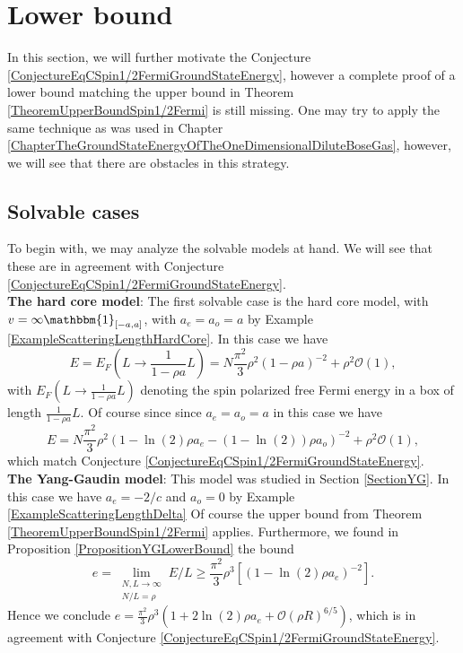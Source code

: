 \section{Lower bound}
In this section, we will further motivate the Conjecture \ref{ConjectureEqCSpin1/2FermiGroundStateEnergy}, however a complete proof of a lower bound matching the upper bound in Theorem \ref{TheoremUpperBoundSpin1/2Fermi} is still missing. One may try to apply the same technique as was used in Chapter \ref{ChapterTheGroundStateEnergyOfTheOneDimensionalDiluteBoseGas}, however, we will see that there are obstacles in this strategy.\\
\subsection{Solvable cases}
To begin with, we may analyze the solvable models at hand. We will see that these are in agreement with Conjecture \ref{ConjectureEqCSpin1/2FermiGroundStateEnergy}.\\

\textbf{The hard core model}: The first solvable case is the hard core model, with $ v=\infty \mathbbm{1}_{[-a,a]} $, with $ a_e=a_o=a $ by Example \ref{ExampleScatteringLengthHardCore}. In this case we have \begin{equation}
E=E_F\left(L\to \frac{1}{1-\rho a}L\right)=N\frac{\pi^2}{3}\rho^2\left(1-\rho a\right)^{-2}+\rho^2\mathcal{O}(1),
\end{equation} 
with $ E_F\left(L\to \frac{1}{1-\rho a}L\right) $ denoting the spin polarized free Fermi energy in a box of length $ \frac{1}{1-\rho a}L $. Of course since since $ a_e=a_o=a $ in this case we have \begin{equation}
E=N\frac{\pi^2}{3}\rho^2\left(1-\ln(2)\rho a_e-(1-\ln(2))\rho a_o\right)^{-2}+\rho^2\mathcal{O}(1),
\end{equation}
which match Conjecture \ref{ConjectureEqCSpin1/2FermiGroundStateEnergy}.\\

\textbf{The Yang-Gaudin model}:
This model was studied in Section \ref{SectionYG}. In this case we have $ a_e=-2/c $ and $ a_o=0 $ by Example \ref{ExampleScatteringLengthDelta} Of course the upper bound from Theorem \ref{TheoremUpperBoundSpin1/2Fermi} applies. Furthermore, we found in Proposition \ref{PropositionYGLowerBound} the bound\begin{equation}
e=\lim\limits_{\substack{N,L\to\infty\\
N/L=\rho}}E/L\geq \frac{\pi^2}{3}\rho^3\left[\left(1-\ln(2)\rho a_e\right)^{-2}\right].
\end{equation}
Hence we conclude $ e=\frac{\pi^2}{3}\rho^3\left(1+2\ln(2)\rho a_e+\mathcal{O}(\rho R)^{6/5}\right) $, which is in agreement with Conjecture \ref{ConjectureEqCSpin1/2FermiGroundStateEnergy}.

